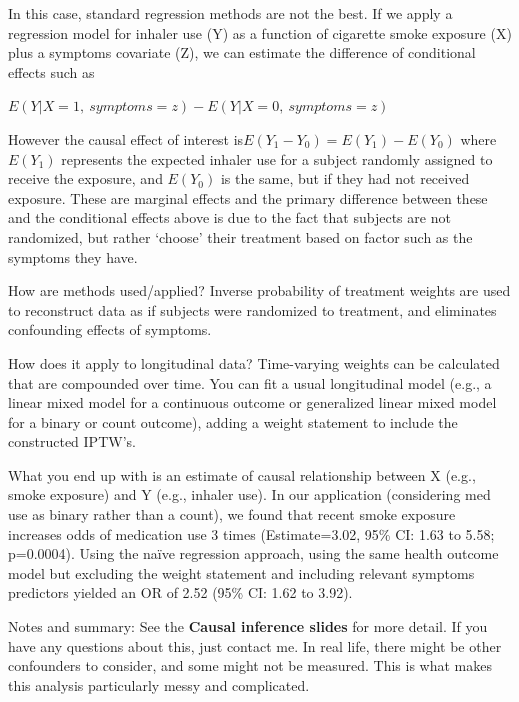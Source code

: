 \documentclass[
  9pt,
  ignorenonframetext,
]{beamer}
\begin{document}
\begin{frame}{}
\protect\hypertarget{section-2}{}
In this case, standard regression methods are not the best. If we apply
a regression model for inhaler use (Y) as a function of cigarette smoke
exposure (X) plus a symptoms covariate (Z), we can estimate the
difference of conditional effects such as

\(E(Y|X=1,\ symptoms=z)-E(Y|X=0,\ symptoms=z)\)

However the causal effect of interest is\(E(Y_1-Y_0)=E(Y_1)-E(Y_0)\)
where \(E(Y_1)\) represents the expected inhaler use for a subject
randomly assigned to receive the exposure, and \(E(Y_0)\) is the same,
but if they had not received exposure. These are marginal effects and
the primary difference between these and the conditional effects above
is due to the fact that subjects are not randomized, but rather `choose'
their treatment based on factor such as the symptoms they have.
\end{frame}

\begin{frame}{}
\protect\hypertarget{section-3}{}
\begin{block}{How are methods used/applied?}
\protect\hypertarget{how-are-methods-usedapplied}{}
Inverse probability of treatment weights are used to reconstruct data as
if subjects were randomized to treatment, and eliminates confounding
effects of symptoms.
\end{block}

\begin{block}{How does it apply to longitudinal data?}
\protect\hypertarget{how-does-it-apply-to-longitudinal-data}{}
Time-varying weights can be calculated that are compounded over time.
You can fit a usual longitudinal model (e.g., a linear mixed model for a
continuous outcome or generalized linear mixed model for a binary or
count outcome), adding a weight statement to include the constructed
IPTW's.
\end{block}
\end{frame}

\begin{frame}{}
\protect\hypertarget{section-4}{}
What you end up with is an estimate of causal relationship between X
(e.g., smoke exposure) and Y (e.g., inhaler use). In our application
(considering med use as binary rather than a count), we found that
recent smoke exposure increases odds of medication use 3 times
(Estimate=3.02, 95\% CI: 1.63 to 5.58; p=0.0004). Using the naïve
regression approach, using the same health outcome model but excluding
the weight statement and including relevant symptoms predictors yielded
an OR of 2.52 (95\% CI: 1.62 to 3.92).

Notes and summary: See the \textbf{Causal inference slides} for more
detail. If you have any questions about this, just contact me. In real
life, there might be other confounders to consider, and some might not
be measured. This is what makes this analysis particularly messy and
complicated.
\end{frame}
\end{document}
